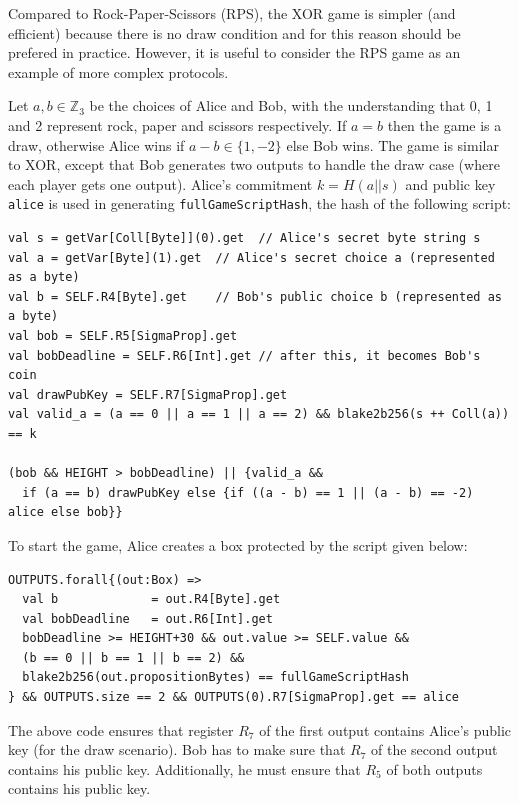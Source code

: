 \documentclass[11pt]{article}
\begin{document}
Compared to Rock-Paper-Scissors (RPS), the XOR game is simpler (and efficient) because there is no draw condition and for this reason should be prefered in practice. However, it is useful to consider the RPS game as an example of more complex protocols.

Let $a, b\in \mathbb{Z}_3$ be the choices of Alice and Bob, with the understanding that 0, 1 and 2 represent rock, paper and scissors respectively. If $a = b$ then the game is a draw, otherwise Alice wins if $a-b \in \{1, -2\}$ else Bob wins. The game is similar to XOR, except that Bob generates two outputs to handle the draw case (where each player gets one output). 
Alice's commitment $k=H(a||s)$ and public key \texttt{alice} is used in generating \texttt{fullGameScriptHash}, the hash of the following script:

\begin{verbatim}
val s = getVar[Coll[Byte]](0).get  // Alice's secret byte string s
val a = getVar[Byte](1).get  // Alice's secret choice a (represented as a byte)
val b = SELF.R4[Byte].get    // Bob's public choice b (represented as a byte)
val bob = SELF.R5[SigmaProp].get
val bobDeadline = SELF.R6[Int].get // after this, it becomes Bob's coin
val drawPubKey = SELF.R7[SigmaProp].get
val valid_a = (a == 0 || a == 1 || a == 2) && blake2b256(s ++ Coll(a)) == k

(bob && HEIGHT > bobDeadline) || {valid_a &&
  if (a == b) drawPubKey else {if ((a - b) == 1 || (a - b) == -2) alice else bob}}
\end{verbatim}

To start the game, Alice creates a box protected by the script given below:

\begin{verbatim}
OUTPUTS.forall{(out:Box) =>
  val b             = out.R4[Byte].get
  val bobDeadline   = out.R6[Int].get
  bobDeadline >= HEIGHT+30 && out.value >= SELF.value &&
  (b == 0 || b == 1 || b == 2) && 
  blake2b256(out.propositionBytes) == fullGameScriptHash
} && OUTPUTS.size == 2 && OUTPUTS(0).R7[SigmaProp].get == alice 
\end{verbatim}


The above code ensures that register $R_7$ of the first output contains Alice's public key (for the draw scenario). Bob has to make sure that $R_7$ of the second output contains his public key. Additionally, he must ensure that $R_5$ of both outputs contains his public key.
\end{document}
